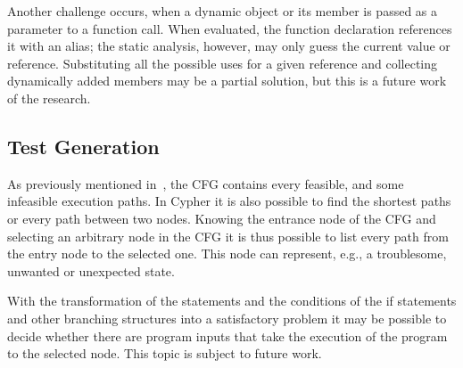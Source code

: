 Another challenge occurs, when a dynamic object or its member is passed as a parameter to a function call. When evaluated, the function declaration references it with an alias; the static analysis, however, may only guess the current value or reference. Substituting all the possible uses for a given reference and collecting dynamically added members may be a partial solution, but this is a future work of the research.

\subsection{Test Generation}
As previously mentioned in~, the CFG contains every feasible, and some infeasible execution paths. In Cypher it is also possible to find the shortest paths or every path between two nodes. Knowing the entrance node of the CFG and selecting an arbitrary node in the CFG it is thus possible to list every path from the entry node to the selected one. This node can represent, e.g., a troublesome, unwanted or unexpected state.

With the transformation of the statements and the conditions of the if statements and other branching structures into a satisfactory problem it may be possible to decide whether there are program inputs that take the execution of the program to the selected node. This topic is subject to future work.


